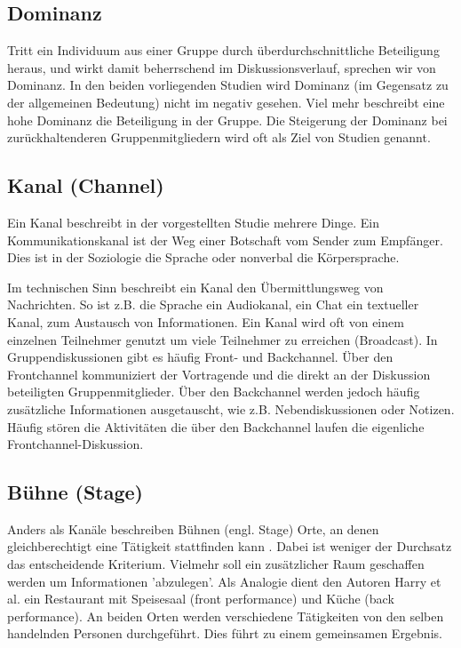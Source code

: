 \documentclass{seminarvorlage}
\begin{document}
\subsection{Dominanz}
Tritt ein Individuum aus einer Gruppe durch üb\-er\-durch\-schnitt\-liche
Beteiligung heraus, und wirkt damit beherrschend im Diskussionsverlauf, sprechen
wir von Dominanz.
In den beiden vorliegenden Studien \cite{HarGorSch2012} \cite{KimChaHolPent2008}
wird Dominanz (im Gegensatz zu der allgemeinen Bedeutung) nicht im negativ
gesehen. Viel mehr beschreibt eine hohe Dominanz die Beteiligung in der Gruppe.
Die Steigerung der Dominanz bei zurückhaltenderen Gruppenmitgliedern wird oft
als Ziel von Studien genannt.

\subsection{Kanal (Channel)}
Ein Kanal beschreibt in der vorgestellten Studie \cite{BergKara2009-1} mehrere Dinge.
Ein Kommunikationskanal ist der Weg einer Botschaft vom Sender zum
Empfänger. Dies ist in der Soziologie die Sprache oder non\-verbal die
Kör\-per\-spra\-che.

Im technischen Sinn beschreibt ein Kanal den Über\-mitt\-lungs\-weg von
Nachrichten.
So ist z.B. die Sprache ein Audiokanal, ein Chat ein textueller Kanal,
zum Austausch von Informationen. Ein Kanal wird oft von einem einzelnen
Teilnehmer genutzt um viele Teilnehmer zu erreichen (Broadcast).
In Gruppendiskussionen gibt es häufig Front- und Backchannel. Über den
Frontchannel kommuniziert der Vortragende und die direkt an der Diskussion
beteiligten Gruppenmitglieder. Über den Backchannel werden jedoch häufig
zusätzliche Informationen ausgetauscht, wie z.B. Nebendiskussionen oder Notizen.
Häufig stören die Aktivitäten die über den Backchannel laufen die eigenliche
Frontchannel-Diskussion.

\subsection{Bühne (Stage)}
Anders als Kanäle beschreiben Bühnen (engl. Stage) Orte, an denen
gleichberechtigt eine Tätigkeit stattfinden kann \cite{Goff1959}. Dabei ist
weniger der Durchsatz das entscheidende Kriterium. Vielmehr soll ein
zusätzlicher Raum geschaffen werden um Informationen 'abzulegen'. Als Analogie dient den
Autoren Harry et al. \cite{HarGorSch2012} ein Restaurant mit Speisesaal (front performance) und Küche
(back performance).
An beiden Orten werden verschiedene Tätigkeiten von den selben handelnden
Personen durchgeführt. Dies führt zu einem gemeinsamen Ergebnis.
\end{document}
